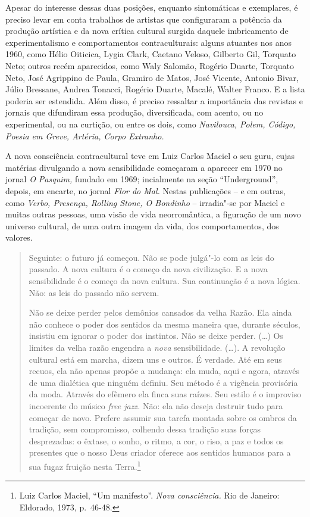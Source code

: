 Apesar do interesse dessas duas posições, enquanto sintomáticas e
exemplares, é preciso levar em conta trabalhos de artistas que
configuraram a potência da produção artística e da nova crítica cultural
surgida daquele imbricamento de experimentalismo e comportamentos
contraculturais: alguns atuantes nos anos 1960, como Hélio Oiticica,
Lygia Clark, Caetano Veloso, Gilberto Gil, Torquato Neto; outros recém
aparecidos, como Waly Salomão, Rogério Duarte, Torquato Neto, José
Agrippino de Paula, Gramiro de Matos, José Vicente, Antonio Bivar, Júlio
Bressane, Andrea Tonacci, Rogério Duarte, Macalé, Walter Franco. E a
lista poderia ser estendida. Além disso, é preciso ressaltar a
importância das revistas e jornais que difundiram essa produção,
diversificada, com acento, ou no experimental, ou na curtição, ou entre
os dois, como \emph{Navilouca, Polem, Código, Poesia em Greve, Artéria,
Corpo Extranho.}

\asterisc

A nova consciência contracultural teve em Luiz Carlos Maciel o seu guru,
cujas matérias divulgando a nova sensibilidade começaram a aparecer em
1970 no jornal \emph{O Pasquim,} fundado em 1969; incialmente na seção
``Underground'', depois, em encarte, no jornal \emph{Flor do Mal.}
Nestas publicações -- e em outras, como \emph{Verbo, Presença, Rolling
Stone, O Bondinho} -- irradia"-se por Maciel e muitas outras pessoas, uma
visão de vida neorromântica, a figuração de um novo universo cultural,
de uma outra imagem da vida, dos comportamentos, dos valores.

\begin{quote}
Seguinte: o futuro já começou. Não se pode julgá"-lo com as leis do
passado. A nova cultura é o começo da nova civilização. E a nova
sensibilidade é o começo da nova cultura. Sua continuação é a nova
lógica. Não: as leis do passado não servem.

Não se deixe perder pelos demônios cansados da velha Razão. Ela ainda
não conhece o poder dos sentidos da mesma maneira que, durante séculos,
insistiu em ignorar o poder dos instintos. Não se deixe perder. (\ldots{}) Os
limites da velha razão engendra a \emph{nova} sensibilidade. (\ldots{}). A
revolução cultural está em marcha, dizem uns e outros. É verdade. Até em
seus recuos, ela não apenas propõe a mudança: ela muda, aqui e agora,
através de uma dialética que ninguém definiu. Seu método é a vigência
provisória da moda. Através do efêmero ela finca suas raízes. Seu estilo
é o improviso incoerente do músico \emph{free jazz.} Não: ela não deseja
destruir tudo para começar de novo. Prefere assumir sua tarefa montada
sobre os ombros da tradição, sem compromisso, colhendo dessa tradição
suas forças desprezadas: o êxtase, o sonho, o ritmo, a cor, o riso, a
paz e todos os presentes que o nosso Deus criador oferece aos sentidos
humanos para a sua fugaz fruição nesta Terra.\footnote{Luiz Carlos
  Maciel, ``Um manifesto''. \emph{Nova consciência.} Rio de Janeiro:
  Eldorado, 1973, p.~46-48.}
\end{quote}

